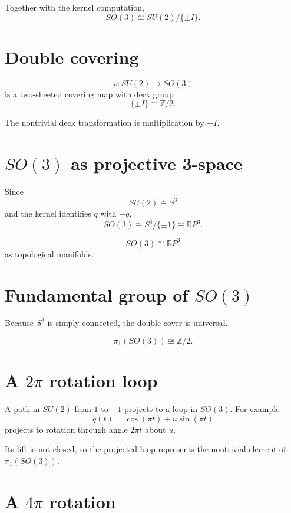 Together with the kernel computation,
\[
SO(3)\cong SU(2)/\{\pm I\}.
\]

\section{Double covering}

\begin{theorem}
\label{thm:viii13-double-cover}
\[
\rho:SU(2)\to SO(3)
\]
is a two-sheeted covering map with deck group
\[
\{\pm I\}\cong\mathbb Z/2.
\]
\end{theorem}

The nontrivial deck transformation is multiplication by \(-I\).

\section{\(SO(3)\) as projective 3-space}

Since
\[
SU(2)\cong S^3
\]
and the kernel identifies \(q\) with \(-q\),
\[
SO(3)\cong S^3/\{\pm1\}\cong\mathbb RP^3.
\]

\begin{corollary}
\label{cor:viii13-rp3}
\[
SO(3)\cong\mathbb RP^3
\]
as topological manifolds.
\end{corollary}

\section{Fundamental group of \(SO(3)\)}

Because \(S^3\) is simply connected, the double cover is universal.

\begin{theorem}
\label{thm:viii13-pi1}
\[
\pi_1(SO(3))\cong\mathbb Z/2.
\]
\end{theorem}

\section{A \(2\pi\) rotation loop}

A path in \(SU(2)\) from \(1\) to \(-1\) projects to a loop in \(SO(3)\).
For example
\[
q(t)=\cos(\pi t)+u\sin(\pi t)
\]
projects to rotation through angle \(2\pi t\) about \(u\).

Its lift is not closed, so the projected loop represents the nontrivial
element of \(\pi_1(SO(3))\).

\section{A \(4\pi\) rotation}


